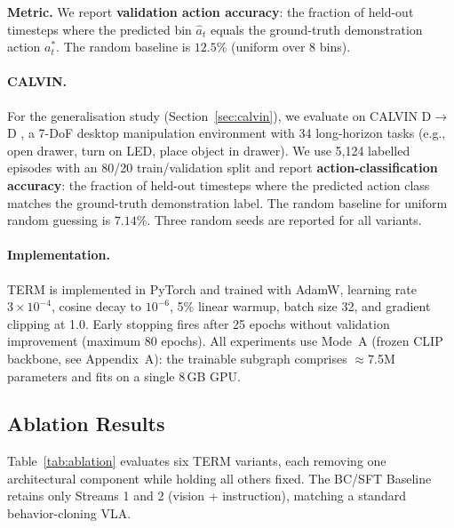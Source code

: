 \documentclass[letterpaper]{article} %
\begin{document}
\textbf{Metric.} We report \textbf{validation action accuracy}: the fraction of held-out timesteps where the predicted bin $\hat{a}_t$ equals the ground-truth demonstration action $a^*_t$. The random baseline is $12.5\%$ (uniform over 8 bins).

\paragraph{CALVIN.}
For the generalisation study (Section~\ref{sec:calvin}), we evaluate on CALVIN D$\to$D \cite{mees2022hulc}, a 7-DoF desktop manipulation environment with 34 long-horizon tasks (e.g., open drawer, turn on LED, place object in drawer). We use 5{,}124 labelled episodes with an 80/20 train/validation split and report \textbf{action-classification accuracy}: the fraction of held-out timesteps where the predicted action class matches the ground-truth demonstration label. The random baseline for uniform random guessing is $7.14\%$. Three random seeds are reported for all variants.

\paragraph{Implementation.}
TERM is implemented in PyTorch and trained with AdamW, learning rate $3{\times}10^{-4}$, cosine decay to $10^{-6}$, 5\% linear warmup, batch size 32, and gradient clipping at 1.0. Early stopping fires after 25 epochs without validation improvement (maximum 80 epochs). All experiments use Mode~A (frozen CLIP backbone, see Appendix~A): the trainable subgraph comprises ${\approx}$7.5M parameters and fits on a single 8\,GB GPU.

\subsection{Ablation Results}

Table~\ref{tab:ablation} evaluates six TERM variants, each removing one architectural component while holding all others fixed. The BC/SFT Baseline retains only Streams 1 and 2 (vision + instruction), matching a standard behavior-cloning VLA.
\end{document}
